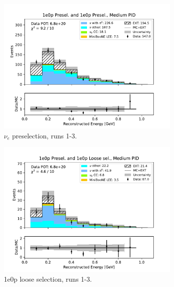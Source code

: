 \begin{figure}[H]
    \centering
    \begin{subfigure}{0.5\linewidth}
        \includegraphics[width=\linewidth]{technote/Sidebands/Figures/NearSideband/near_sideband_reco_e_run123_ZP_ZP_MEDIUM_PID.pdf}
        \caption{$\nu_e$ preselection, runs 1-3.}
    \end{subfigure}%
    \begin{subfigure}{0.5\linewidth}
        \includegraphics[width=\linewidth]{technote/Sidebands/Figures/NearSideband/near_sideband_reco_e_run123_ZP_ZPLOOSESEL_MEDIUM_PID.pdf}
        \caption{1e0p loose selection, runs 1-3.}
    \end{subfigure}
    \begin{subfigure}{0.5\linewidth}

\end{subfigure}
\end{figure}
